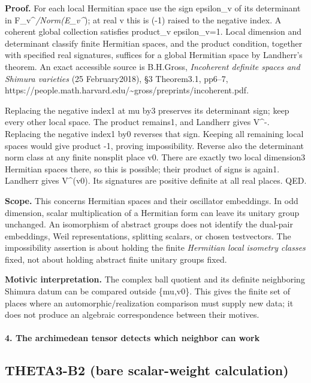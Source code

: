 \textbf{Proof.} For each local Hermitian space use the sign epsilon\_v of its determinant in F\_v\^{}\emph{/Norm(E\_v\^{}}); at real v this is (-1) raised to the negative index. A coherent global collection satisfies product\_v epsilon\_v=1. Local dimension and determinant classify finite Hermitian spaces, and the product condition, together with specified real signatures, suffices for a global Hermitian space by Landherr's theorem. An exact accessible source is B.H.Gross, \emph{Incoherent definite spaces and Shimura varieties} (25 February2018), §3 Theorem3.1, pp6--7, https://people.math.harvard.edu/\textasciitilde gross/preprints/incoherent.pdf.

Replacing the negative index1 at mu by3 preserves its determinant sign; keep every other local space. The product remains1, and Landherr gives V\^{}-. Replacing the negative index1 by0 reverses that sign. Keeping all remaining local spaces would give product -1, proving impossibility. Reverse also the determinant norm class at any finite nonsplit place v0. There are exactly two local dimension3 Hermitian spaces there, so this is possible; their product of signs is again1. Landherr gives V\^{}(v0). Its signatures are positive definite at all real places. QED.

\textbf{Scope.} This concerns Hermitian spaces and their oscillator embeddings. In odd dimension, scalar multiplication of a Hermitian form can leave its unitary group unchanged. An isomorphism of abstract groups does not identify the dual-pair embeddings, Weil representations, splitting scalars, or chosen testvectors. The impossibility assertion is about holding the finite \emph{Hermitian local isometry classes} fixed, not about holding abstract finite unitary groups fixed.

\textbf{Motivic interpretation.} The complex ball quotient and its definite neighboring Shimura datum can be compared outside \{mu,v0\}. This gives the finite set of places where an automorphic/realization comparison must supply new data; it does not produce an algebraic correspondence between their motives.

\paragraph{4. The archimedean tensor detects which neighbor can work}\label{the-archimedean-tensor-detects-which-neighbor-can-work}

\subsection{THETA3-B2 (bare scalar-weight calculation)}\label{theta3-b2-bare-scalar-weight-calculation}\label{B2}

